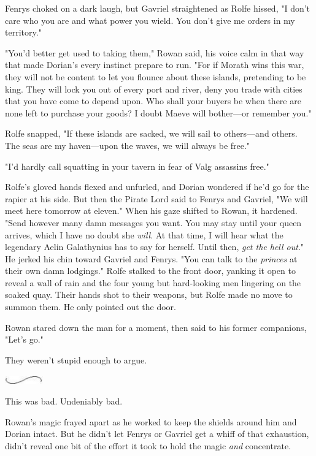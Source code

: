 Fenrys choked on a dark laugh, but Gavriel straightened as Rolfe hissed, "I don't care who you are and what power you wield.
You don't give me orders in my territory."

"You'd better get used to taking them," Rowan said, his voice calm in that way that made Dorian's every instinct prepare to run.
"For if Morath wins this war, they will not be content to let you flounce about these islands, pretending to be king.
They will lock you out of every port and river, deny you trade with cities that you have come to depend upon.
Who shall your buyers be when there are none left to purchase your goods?
I doubt Maeve will bother---or remember you."

Rolfe snapped, "If these islands are sacked, we will sail to others---and others.
The seas are my haven---upon the waves, we will always be free."

"I'd hardly call squatting in your tavern in fear of Valg assassins free."

Rolfe's gloved hands flexed and unfurled, and Dorian wondered if he'd go for the rapier at his side.
But then the Pirate Lord said to Fenrys and Gavriel, "We will meet here tomorrow at eleven."
When his gaze shifted to Rowan, it hardened.
"Send however many damn messages you want.
You may stay until your queen arrives, which I have no doubt she \emph{will}.
At that time, I will hear what the legendary Aelin Galathynius has to say for herself.
Until then, \emph{get the hell out}."
He jerked his chin toward Gavriel and Fenrys.
"You can talk to the \emph{princes} at their own damn lodgings."
Rolfe stalked to the front door, yanking it open to reveal a wall of rain and the four young but hard-looking men lingering on the soaked quay.
Their hands shot to their weapons, but Rolfe made no move to summon them.
He only pointed out the door.

Rowan stared down the man for a moment, then said to his former companions, "Let's go."

They weren't stupid enough to argue.

\begin{center}
	\includegraphics[width=0.65in,height=0.13in]{images/seperator}
\end{center}

This was bad.
Undeniably bad.

Rowan's magic frayed apart as he worked to keep the shields around him and Dorian intact.
But he didn't let Fenrys or Gavriel get a whiff of that exhaustion, didn't reveal one bit of the effort it took to hold the magic \emph{and} concentrate.


